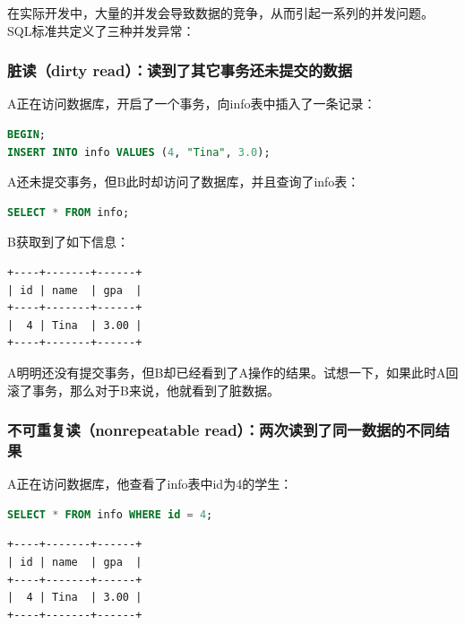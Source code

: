 \documentclass[12pt, openany, oneside]{book}
\begin{document}
在实际开发中，大量的并发会导致数据的竞争，从而引起一系列的并发问题。\\

SQL标准共定义了三种并发异常：

\subsubsection{脏读（dirty read）：读到了其它事务还未提交的数据}

A正在访问数据库，开启了一个事务，向info表中插入了一条记录：

\vspace{-0.5cm}

\begin{lstlisting}[language=SQL]
BEGIN;
INSERT INTO info VALUES (4, "Tina", 3.0);
\end{lstlisting}

A还未提交事务，但B此时却访问了数据库，并且查询了info表：

\vspace{-0.5cm}

\begin{lstlisting}[language=SQL]
SELECT * FROM info;
\end{lstlisting}

B获取到了如下信息：

\begin{tcolorbox}
\begin{verbatim}
+----+-------+------+
| id | name  | gpa  |
+----+-------+------+
|  4 | Tina  | 3.00 |
+----+-------+------+
	\end{verbatim}
\end{tcolorbox}

A明明还没有提交事务，但B却已经看到了A操作的结果。试想一下，如果此时A回滚了事务，那么对于B来说，他就看到了脏数据。

\subsubsection{不可重复读（nonrepeatable read）：两次读到了同一数据的不同结果}

A正在访问数据库，他查看了info表中id为4的学生：

\vspace{-0.5cm}

\begin{lstlisting}[language=SQL]
SELECT * FROM info WHERE id = 4;
\end{lstlisting}

\begin{tcolorbox}
\begin{verbatim}
+----+-------+------+
| id | name  | gpa  |
+----+-------+------+
|  4 | Tina  | 3.00 |
+----+-------+------+
	\end{verbatim}
\end{tcolorbox}
\end{document}
